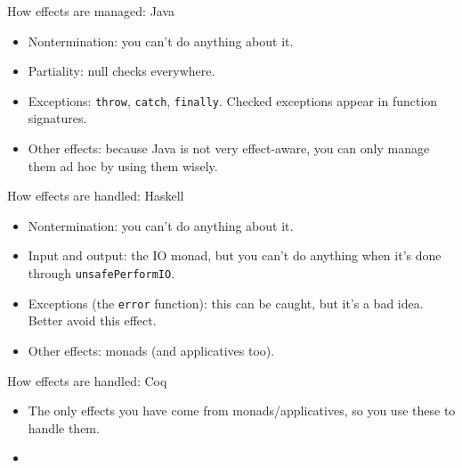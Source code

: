 \documentclass{beamer}
\begin{document}
\begin{frame}{How effects are managed: Java}
\begin{itemize}
	\item Nontermination: you can't do anything about it.
	\item Partiality: null checks everywhere.
	\item Exceptions: \texttt{throw}, \texttt{catch}, \texttt{finally}. Checked exceptions appear in function signatures.
	\item Other effects: because Java is not very effect-aware, you can only manage them ad hoc by using them wisely.
\end{itemize}
\end{frame}

\begin{frame}{How effects are handled: Haskell}
\begin{itemize}
	\item Nontermination: you can't do anything about it.
	\item Input and output: the IO monad, but you can't do anything when it's done through \texttt{unsafePerformIO}.
	\item Exceptions (the \texttt{error} function): this can be caught, but it's a bad idea. Better avoid this effect.
	\item Other effects: monads (and applicatives too).
\end{itemize}
\end{frame}

\begin{frame}{How effects are handled: Coq}
\begin{itemize}
	\item The only effects you have come from monads/applicatives, so you use these to handle them.
\end{itemize}
\end{frame}


\begin{frame}{}
\begin{itemize}
	\item
\end{itemize}
\end{frame}
\end{document}
